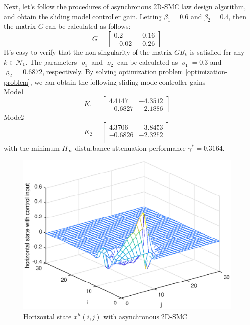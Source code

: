 \documentclass[conference]{IEEEtran}
\begin{document}
Next, let's follow the procedures of asynchronous 2D-SMC law design algorithm, and obtain the sliding model controller gain. 
Letting $\beta_{1}=0.6$ and $\beta_{2}=0.4$, then the  matrix $G$ can be calculated as follows:
\begin{equation*}
G=\begin{bmatrix}
0.2&-0.16\\
-0.02&-0.26
\end{bmatrix}
\end{equation*}
It's easy to verify that the non-singularity of the matrix $GB_{k}$ is satisfied for any $k\in\mathcal{N}_{1}$. The parameters $\varrho_{1}$ and $\varrho_{2}$ can be calculated as $\varrho_{1}=0.3$ and $\varrho_{2}=0.6872$, respectively. By solving optimization problem \eqref{optimization-problem}, we can obtain the following sliding mode controller gains\\
Mode1
\begin{equation*}
 	K_{1}=\begin{bmatrix}
 	4.4147  & -4.3512\\
 	-0.6827 &  -2.1886
 	\end{bmatrix}
\end{equation*}
Mode2
\begin{equation*}
K_{2} = 	\begin{bmatrix}
 4.3706  & -3.8453 \\
-0.6826 &  -2.3252 \\
\end{bmatrix}
\end{equation*}
with the minimum $H_{\infty}$ disturbance attenuation performance $\gamma^{*}=0.3164$. 
\begin{figure}[!htb]
	\centering\includegraphics[scale=0.6]{./simulations/h-state-with-force.eps}
	\caption{Horizontal state $x^{h}(i,j)$ with  asynchronous 2D-SMC}
	\label{fig5}
\end{figure}
\end{document}
